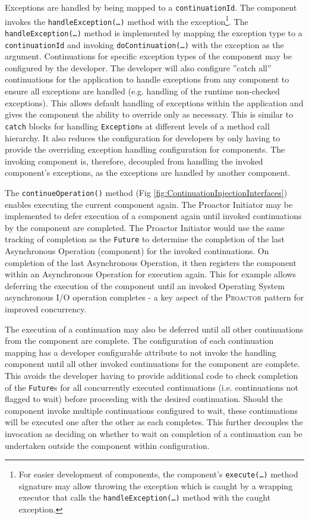 \documentclass[prodmode]{style/acmlarge}
\begin{document}
Exceptions are handled by being mapped to a \texttt{continuationId}.  The
component invokes the \texttt{handle\-Excep\-tion(\ldots)} method with the
exception\footnote{For easier development of components, the component's
\texttt{execute(\ldots)} method signature may allow throwing the exception which
is caught by a wrapping executor that calls the \texttt{handleException(\ldots)}
method with the caught exception.}.  The \texttt{handleException(\ldots)} method
is implemented by mapping the exception type to a \texttt{continuationId} and
invoking \texttt{doContinuation(\ldots)} with the exception as the argument.
Continuations for specific exception types of the component may be configured by
the developer.  The developer will also configure ''catch all'' continuations
for the application to handle exceptions from any component to ensure all
exceptions are handled (e.g. handling of the runtime non-checked exceptions).
This allows default handling of exceptions within the application and gives the
component the ability to override only as necessary.  This is similar to
\texttt{catch} blocks for handling \texttt{Exception}s at different levels of a
method call hierarchy.  It also reduces the configuration for developers by only
having to provide the overriding exception handling configuration for
components.  The invoking component is, therefore, decoupled from handling the
invoked component's exceptions, as the exceptions are handled by another
component.

The \texttt{continueOperation()} method (Fig
\ref{fig:ContinuationInjectionInterfaces}) enables executing the current
component again.  The Proactor Initiator may be implemented to defer execution
of a component again until invoked continuations by the component are completed.
 The Proactor Initiator would use the same tracking of completion as the
\texttt{Future} to determine the completion of the last Asynchronous Operation
(component) for the invoked continuations.  On completion of the last
Asynchronous Operation, it then registers the component within an Asynchronous
Operation for execution again.  This for example allows deferring the execution
of the component until an invoked Operating System asynchronous I/O operation
completes - a key aspect of the \textsc{Proactor} pattern for improved
concurrency.

The execution of a continuation may also be deferred until all other
continuations from the component are complete.  The configuration of each
continuation mapping has a developer configurable attribute to not invoke the
handling component until all other invoked continuations for the component are
complete.  This avoids the developer having to provide additional code to check
completion of the \texttt{Future}s for all concurrently executed continuations
(i.e. continuations not flagged to wait) before proceeding with the desired
continuation.  Should the component invoke multiple continuations configured to
wait, these continuations will be executed one after the other as each
completes.  This further decouples the invocation as deciding on whether to wait
on completion of a continuation can be undertaken outside the component within
configuration.
\end{document}
